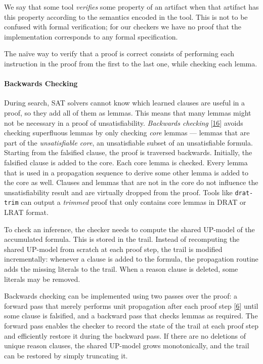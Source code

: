 \documentclass[
]{report}
\begin{document}
We say that some tool \emph{verifies} some property of an artifact when
that artifact has this property according to the semantics encoded in
the tool. This is not to be confused with formal verification; for our
checkers we have no proof that the implementation corresponds to any
formal specification.

The naïve way to verify that a proof is correct consists of performing
each instruction in the proof from the first to the last one, while
checking each lemma.

\paragraph{Backwards Checking}

During search, SAT solvers cannot know which learned clauses are useful
in a proof, so they add all of them as lemmas. This means that many
lemmas might not be necessary in a proof of unsatisfiability.
\emph{Backwards checking} {[}\protect\hyperlink{ref-Heule_2013}{16}{]}
avoids checking superfluous lemmas by only checking \emph{core} lemmas
--- lemmas that are part of the \emph{unsatisfiable core}, an
unsatisfiable subset of an unsatisfiable formula. Starting from the
falsified clause, the proof is traversed backwards. Initially, the
falsified clause is added to the core. Each core lemma is checked. Every
lemma that is used in a propagation sequence to derive some other lemma
is added to the core as well. Clauses and lemmas that are not in the
core do not influence the unsatisfiability result and are virtually
dropped from the proof. Tools like \texttt{drat-trim} can output a
\emph{trimmed} proof that only contains core lemmas in DRAT or LRAT
format.

To check an inference, the checker needs to compute the shared UP-model
of the accumulated formula. This is stored in the trail. Instead of
recomputing the shared UP-model from scratch at each proof step, the
trail is modified incrementally: whenever a clause is added to the
formula, the propagation routine adds the missing literals to the trail.
When a reason clause is deleted, some literals may be removed.

Backwards checking can be implemented using two passes over the proof: a
forward pass that merely performs unit propagation after each proof step
{[}\protect\hyperlink{ref-RebolaCruz2018}{6}{]} until some clause is
falsified, and a backward pass that checks lemmas as required. The
forward pass enables the checker to record the state of the trail at
each proof step and efficiently restore it during the backward pass. If
there are no deletions of unique reason clauses, the shared UP-model
grows monotonically, and the trail can be restored by simply truncating
it.
\end{document}
